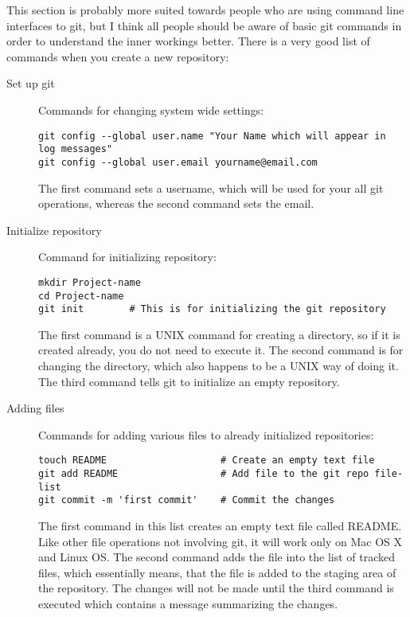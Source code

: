 \documentclass[
]{scrartcl}
\begin{document}
%
This section is probably more suited towards people who are using command line
    interfaces to git, but I think all people should be aware of basic git
    commands in order to understand the inner workings better.
%
There is a very good list of commands when you create a new 
 repository:
%
\begin{description}
    \item[Set up git] Commands for changing system wide settings:
\begin{lstlisting}
git config --global user.name "Your Name which will appear in log messages"
git config --global user.email yourname@email.com
\end{lstlisting}
        The first command sets a username, which will be used for your all git
            operations, whereas the second command sets the email.

    \item[Initialize repository] Command for initializing repository:
\begin{lstlisting}
mkdir Project-name
cd Project-name
git init        # This is for initializing the git repository
\end{lstlisting}
        The first command is a UNIX command for creating a directory, so if it
            is created already, you do not need to execute it.
        The second command is for changing the directory, which also happens to
            be a UNIX way of doing it.
        The third command tells git to initialize an empty repository.

    \item[Adding files] Commands for adding various files to already initialized
        repositories:
\begin{lstlisting}
touch README                    # Create an empty text file
git add README                  # Add file to the git repo file-list
git commit -m 'first commit'    # Commit the changes
\end{lstlisting}
        The first command in this list creates an empty text file called README.
        Like other file operations not involving git, it will work only on Mac
            OS X and Linux OS.
        The second command adds the file into the list of tracked files, which
            essentially means, that the file is added to the staging area of the
            repository.
        The changes will not be made until the third command is executed which
            contains a message summarizing the changes.


\end{description}
\end{document}
